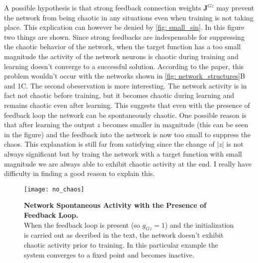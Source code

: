 A possible hypothesis is that strong feedback connection 
weights $\mathbf{J}^{Gz}$ may prevent the network from being chaotic
in any situations even when training is not taking place. This explication
can however be denied by \autoref{fig: small_sin}.
In this figure two things are shown. Since strong feedbacks are
indespensable for suppressing the chaotic behavior of the network,
when the target function has a too small magnitude the activity
of the network neurons is chaotic during training and learning doesn't
converge to a successful solution. According to the paper, this problem
wouldn't occur with the networks shown in 
\autoref{fig: network_structures}B and 1C.
The second obeservation is more interesting. The network activity is in fact
not chaotic before training, but it becomes chaotic during learning and
remains chaotic even after learning. This suggests that even with the
presence of feedback loop the network can be spontaneously chaotic.
One possible reason is that after learning the output $z$ becomes
smaller in magnitude (this can be seen in the figure) and the feedback
into the network is now too small to suppress the chaos. This explanation
is still far from satisfying since the change of $|z|$ is not always 
significant but by traing the network with a target function with small
magnitude we are always able to exhibit chaotic activity at the end.
I really have difficulty in finding a good reason to explain this.

\begin{figure}[H]
  \centering
  \texttt{[image: no\_chaos]}
  \caption{
    \textbf{Network Spontaneous Activity with the Presence of Feedback Loop.}
    \\[0.1em]
    When the feedback loop is present (so $g_{Gz}=1$) and the initialization
    is carried out as decribed in the text, the network doesn't exhibit 
    chaotic activity prior to training. In this particular example the 
    system converges to a fixed point and becomes inactive.
  }
  \label{fig: no_chaos}
\end{figure}

\newpage

